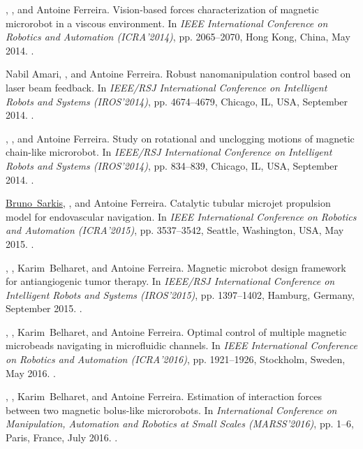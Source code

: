 \begin{Mybibliography}{10}
  \KBelharet, \DavidFolio, and Antoine Ferreira.
  \newblock Vision-based forces characterization of magnetic microrobot in a
  viscous environment.
  \newblock In \emph{IEEE International Conference on Robotics and Automation
    (ICRA'2014)}, pp. 2065--2070, Hong Kong, China, May 2014{}.
  \newblock {}.
  
  Nabil Amari, \DavidFolio, and Antoine Ferreira.
  \newblock Robust nanomanipulation control based on laser beam feedback.
  \newblock In \emph{IEEE/RSJ International Conference on Intelligent Robots and
    Systems (IROS'2014)}, pp. 4674--4679, Chicago, IL, USA, September
  2014{}.
  \newblock {}.
  
  \KBelharet, \DavidFolio, and Antoine Ferreira.
  \newblock Study on rotational and unclogging motions of magnetic chain-like
  microrobot.
  \newblock In \emph{IEEE/RSJ International Conference on Intelligent Robots and
    Systems (IROS'2014)}, pp. 834--839, Chicago, IL, USA, September
  2014{}.
  \newblock {}.
  
  \underline{Bruno~Sarkis}, \DavidFolio, and Antoine Ferreira.
  \newblock Catalytic tubular microjet propulsion model for endovascular
  navigation.
  \newblock In \emph{IEEE International Conference on Robotics and Automation
    (ICRA'2015)}, pp. 3537--3542, Seattle, Washington, USA, May 2015.
  \newblock {}.
  
  \LMellal, \DavidFolio, Karim~Belharet, and Antoine Ferreira.
  \newblock Magnetic microbot design framework for antiangiogenic tumor therapy.
  \newblock In \emph{IEEE/RSJ International Conference on Intelligent Robots and
    Systems (IROS'2015)}, pp. 1397--1402, Hamburg, Germany, September
  2015{}.
  \newblock {}.
  
  \LMellal, \DavidFolio, Karim~Belharet, and Antoine Ferreira.
  \newblock Optimal control of multiple magnetic microbeads navigating in
  microfluidic channels.
  \newblock In \emph{IEEE International Conference on Robotics and Automation
    (ICRA'2016)}, pp. 1921--1926, Stockholm, Sweden, May 2016{}. 
  \newblock {}.
  
  \LMellal, \DavidFolio, Karim~Belharet, and Antoine Ferreira.
  \newblock Estimation of interaction forces between two magnetic bolus-like
  microrobots.
  \newblock In \emph{International Conference on Manipulation, Automation and
    Robotics at Small Scales (MARSS'2016)}, pp. 1--6, Paris, France, July
  2016{}.
  \newblock {}.
  

\end{Mybibliography}
